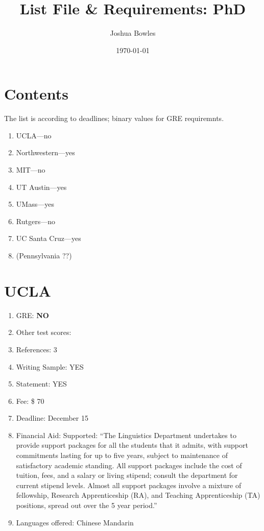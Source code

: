 \documentclass[11pt]{article}
\begin{document}
\author{Joshua Bowles}
\title{List File \& Requirements: PhD}
\date{\today}
\maketitle

\section{Contents}
The list is according to deadlines; binary values for GRE requiremnts.
\begin{enumerate}
\item UCLA---no
\item Northwestern---yes
\item MIT---no
\item UT Austin---yes
\item UMass---yes 
\item Rutgers---no 
\item UC Santa Cruz---yes
\item (Pennsylvania ??)
\end{enumerate}


\section{UCLA}
\begin{enumerate}
\item GRE: {\bf NO}
\item Other test scores:
\item References: 3
\item Writing Sample: YES
\item Statement: YES
\item Fee: \$ 70
\item Deadline: December 15
\item Financial Aid: Supported: ``The Linguistics Department undertakes to provide support packages for all the students that it admits, with support commitments lasting for up to five years, subject to maintenance of satisfactory academic standing. All support packages include the cost of tuition, fees, and a salary or living stipend; consult the department for current stipend levels.  Almost all support packages involve a mixture of fellowship, Research Apprenticeship (RA), and Teaching Apprenticeship (TA) positions, spread out over the 5 year period.''
\item Languages offered: Chinese Mandarin
\end{enumerate}
\end{document}
